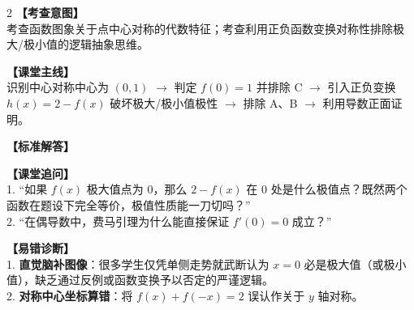 \documentclass[12pt,a4paper]{ctexart}
\begin{document}
\vspace{0.8em}
\par{}
\vspace{0.8em}

\qFourStem
\qFourOptions

\begin{paracol}{2}
  \textbf{【考查意图】}\\
  考查函数图象关于点中心对称的代数特征；考查利用正负函数变换对称性排除极大/极小值的逻辑抽象思维。
  
  \textbf{【课堂主线】}\\
  识别中心对称中心为 \((0,1)\) \(\to\) 判定 \(f(0)=1\) 并排除 C \(\to\) 引入正负变换 \(h(x)=2-f(x)\) 破坏极大/极小值极性 \(\to\) 排除 A、B \(\to\) 利用导数正面证明。
  
  \textbf{【标准解答】}\\
  \qFourSolution
  
  \textbf{【课堂追问】}\\
  1. “如果 \(f(x)\) 极大值点为 0，那么 \(2-f(x)\) 在 0 处是什么极值点？既然两个函数在题设下完全等价，极值性质能一刀切吗？”\\
  2. “在偶导数中，费马引理为什么能直接保证 \(f'(0)=0\) 成立？”
  
  \switchcolumn
  \textbf{【易错诊断】}\\
  1. \textbf{直觉脑补图像}：很多学生仅凭单侧走势就武断认为 \(x=0\) 必是极大值（或极小值），缺乏通过反例或函数变换予以否定的严谨逻辑。\\
  2. \textbf{对称中心坐标算错}：将 \(f(x)+f(-x)=2\) 误认作关于 \(y\) 轴对称。
\end{paracol}

\vspace{0.8em}
\par{}
\vspace{0.8em}

\newpage

\begin{minipage}[t]{0.7\textwidth}
  \vspace{0pt}
  \qFiveStem
  \qFiveOptions
\end{minipage}
\hfill
\begin{minipage}[t]{0.26\textwidth}
  \vspace{0pt}
  \hfill
  \qFiveFigure[0.9]
\end{minipage}
\end{document}
